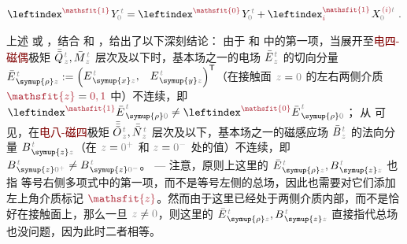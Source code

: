 \begin{align} \label{eq:1BC}
	\leftindex^{\textcolor{Maroon}{\mathsfit{1}}} \;\! Y^{\;\!\mathcolor{gray}{t}}_{\mathcolor{gray}{0}} = \leftindex^{\textcolor{Maroon}{\mathsfit{0}}} \;\! Y^{\;\!\mathcolor{gray}{t}}_{\mathcolor{gray}{0}} + \leftindex^{\textcolor{Maroon}{\mathsfit{1}}}_{\textcolor{Maroon}{i}} \;\! X^{\;\!\textcolor{Maroon}{(i)}\mathcolor{gray}{t}}_{\mathcolor{gray}{0}} ~.
\end{align}

上述  或 ，结合  和 ，给出了以下深刻结论：{\one} 由于  和  中的第一项，当展开至\textcolor{Maroon}{电四-磁偶}极矩 $\bar{\bar{Q}}^{\;\!\mathcolor{gray}{t}}_{\;\!\mathcolor{gray}{z}}, \bar{M}^{\;\!\mathcolor{gray}{t}}_{\;\!\mathcolor{gray}{z}}$ 层次及以下时，基本场之一的电场 $\bar{E}^{\;\!\mathcolor{gray}{t}}_{\;\!\mathcolor{gray}{z}}$ 的切向分量 $\bar{E}^{\;\!\mathcolor{gray}{t}}_{\;\! \symup{\rho} \mathcolor{gray}{z}} := \begin{pmatrix} E^{\;\!\mathcolor{gray}{t}}_{\;\! \symup{x} \mathcolor{gray}{z}}, & E^{\;\!\mathcolor{gray}{t}}_{\;\! \symup{y} \mathcolor{gray}{z}} \end{pmatrix}^\mathsf{T}$（在接触面 $\mathcolor{gray}{z \mathcolor{black}{=} 0}$ 的左右两侧介质 $\textcolor{Maroon}{\mathsfit{z}} = \textcolor{Maroon}{0,1}$ 中）不连续，即 $\leftindex^{\textcolor{Maroon}{\mathsfit{1}}} {\bar{E}}^{\;\!\mathcolor{gray}{t}}_{\;\! \symup{\rho} \mathcolor{gray}{0}} \neq \leftindex^{\textcolor{Maroon}{\mathsfit{0}}} {\bar{E}}^{\;\!\mathcolor{gray}{t}}_{\;\! \symup{\rho} \mathcolor{gray}{0}}$；{\two} 从  可见，在\textcolor{Maroon}{电八-磁四}极矩 $\bar{\bar{\bar{O}}}^{\;\!\mathcolor{gray}{t}}_{\;\!\mathcolor{gray}{z}}, \bar{\bar{N}}^{\;\!\mathcolor{gray}{t}}_{\;\!\mathcolor{gray}{z}}$ 层次及以下，基本场之一的磁感应场 $\bar{B}^{\;\!\mathcolor{gray}{t}}_{\;\!\mathcolor{gray}{z}}$ 的法向分量 $B^{\;\!\mathcolor{gray}{t}}_{\;\! \symup{z} \mathcolor{gray}{z}}$（在 $\mathcolor{gray}{z \mathcolor{black}{=} 0^+}$ 和 $\mathcolor{gray}{z \mathcolor{black}{=} 0^-}$ 处的值）不连续，即 $B^{\;\!\mathcolor{gray}{t}}_{\;\! \symup{z} \mathcolor{gray}{0^+}} \neq B^{\;\!\mathcolor{gray}{t}}_{\;\! \symup{z} \mathcolor{gray}{0^-}}$。 ---  注意，原则上这里的 $\bar{E}^{\;\!\mathcolor{gray}{t}}_{\;\! \symup{\rho} \mathcolor{gray}{z}},B^{\;\!\mathcolor{gray}{t}}_{\;\! \symup{z} \mathcolor{gray}{z}}$ 也指  等号右侧多项式中的第一项，而不是等号左侧的总场，因此也需要对它们添加左上角介质标记 $\textcolor{Maroon}{\mathsfit{z}}$。然而由于这里已经处于两侧介质内部，而不是恰好在接触面上，那么一旦 $\mathcolor{gray}{z} \neq \mathcolor{gray}{0}$，则这里的 $\bar{E}^{\;\!\mathcolor{gray}{t}}_{\;\! \symup{\rho} \mathcolor{gray}{z}},B^{\;\!\mathcolor{gray}{t}}_{\;\! \symup{z} \mathcolor{gray}{z}}$ 直接指代总场  也没问题，因为此时二者相等。

